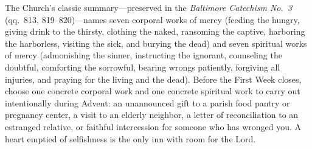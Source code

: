The Church's classic summary---preserved in the \textit{Baltimore Catechism No.~3} (qq.~813, 819--820)---names seven corporal works of mercy (feeding the hungry, giving drink to the thirsty, clothing the naked, ransoming the captive, harboring the harborless, visiting the sick, and burying the dead) and seven spiritual works of mercy (admonishing the sinner, instructing the ignorant, counseling the doubtful, comforting the sorrowful, bearing wrongs patiently, forgiving all injuries, and praying for the living and the dead). Before the First Week closes, choose one concrete corporal work and one concrete spiritual work to carry out intentionally during Advent: an unannounced gift to a parish food pantry or pregnancy center, a visit to an elderly neighbor, a letter of reconciliation to an estranged relative, or faithful intercession for someone who has wronged you. A heart emptied of selfishness is the only inn with room for the Lord.
